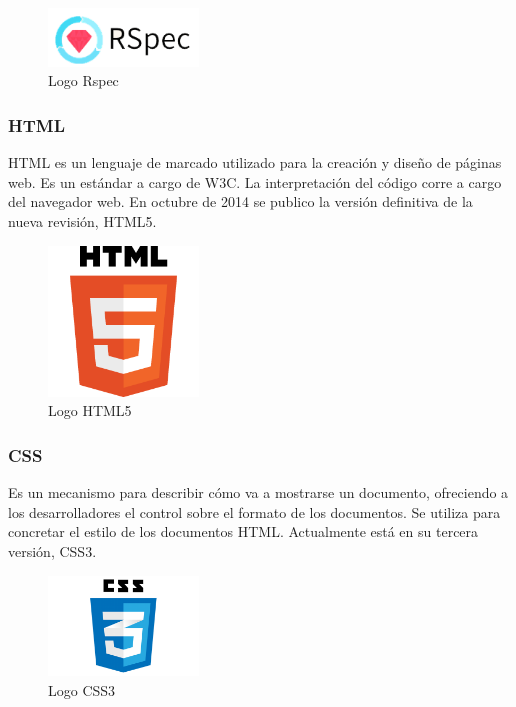 		\begin{figure}[H]
		\centering
		\includegraphics[width=40mm, fbox={\fboxrule} 4mm]{images/04-metodo/25-rspec_logo.png}
		\caption{Logo Rspec}
		\label{fig:rspec-logo}
		\end{figure}
		
		\subsubsection{\ac{HTML}}
		\ac{HTML} es un lenguaje de marcado utilizado para la creación y diseño de páginas web. Es un estándar a cargo de \ac{W3C}. La interpretación del código corre a cargo del navegador web. En octubre de 2014 se publico la versión definitiva de la nueva revisión, \ac{HTML}5.
		
		\begin{figure}[H]
		\centering
		\includegraphics[width=40mm, fbox={\fboxrule} 4mm]{images/04-metodo/26-html_logo.png}
		\caption{Logo HTML5}
		\label{fig:html5-logo}
		\end{figure}
		
		\subsubsection{\ac{CSS}}
		Es un mecanismo para describir cómo va a mostrarse un documento, ofreciendo a los desarrolladores el control sobre el formato de los documentos. Se utiliza para concretar el estilo de los documentos \ac{HTML}. Actualmente está en su tercera versión, \ac{CSS}3.

		\begin{figure}[H]
		\centering
		\includegraphics[width=40mm, fbox={\fboxrule} 4mm]{images/04-metodo/27-css3_logo.png}
		\caption{Logo CSS3}
		\label{fig:css3-logo}
		\end{figure}	
		
